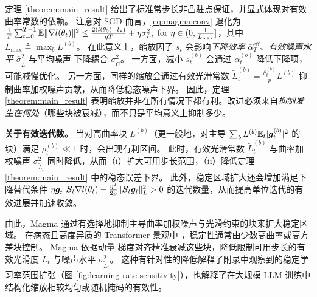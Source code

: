 \documentclass[11pt, a4paper, twocolumn, copyright, goog]{google}
\theoremstyle{plain}
\theoremstyle{definition}
\theoremstyle{remark}
\begin{document}
定理 \ref{theorem:main_result} 给出了标准常步长非凸驻点保证，并显式体现对有效曲率常数的依赖。
注意对 SGD 而言，\eqref{eq:magma:conv} 退化为 $\frac{1}{T} \sum_{t=0}^{T-1} \mathbb{E} \| \nabla l(\theta_t ) \|^2 \le \frac{2 (l(\theta_0) - l_*)}{\eta T} + \eta \sigma_L^2, \; \text{for } \eta \in (0, \frac{1}{L_{\max}}]$，其中 $L_{\max} \triangleq \max_b L^{(b)}$。
在此意义上，缩放因子 $s_t$ 会影响\emph{下降效率} $\bar{\alpha}_T^{\mathrm{eff}}$、\emph{有效噪声水平} $\bar{\sigma}^2_{\tilde{L}}$ 与平均噪声-下降耦合 $\sigma^2_{\bar{C}}$。
一方面，减小 $s_t^{(b)}$ 会通过 $\alpha_t^{(b)}$ 降低下降项，
可能减慢优化。
另一方面，同样的缩放会通过有效光滑常数 $\tilde{L}_t^{(b)} = \frac{\rho_t^{(b)}}{p} L^{(b)}$ 抑制曲率加权噪声贡献，从而降低稳态噪声下界。
因此，定理 \ref{theorem:main_result} 表明缩放并非在所有情况下都有利。改进必须来自\textit{抑制发生在何处}（哪些块被衰减），而不只是平均意义上抑制多少。


\textbf{关于有效迭代数。}
当对高曲率块 $L^{(b)}$（更一般地，对主导 $\sum_b L^{(b)} \mathbb{E}_t |{\bm{g}}_t^{(b)}|^2$ 的块）满足 $\rho_t^{(b)} \ll 1$ 时，会出现有利区间。
此时，有效光滑常数 $\tilde L_t^{(b)}$ 与曲率加权噪声 $\sigma^2_{\tilde L_t}$ 同时降低，从而（i）扩大可用步长范围，（ii）降低定理 \ref{theorem:main_result} 中的稳态误差下界。
此外，稳定区域扩大还会增加满足下降替代条件 $\eta {\bm{g}}_t^\top {\bm{S}}_t\nabla l(\theta_t) - \frac{\eta^2}{2p}\|{\bm{S}}_t {\bm{g}}_t\|_L^2 > 0$ 的迭代数量，从而提高单位迭代的有效进展并加速收敛。


由此，Magma 通过有选择地抑制主导曲率加权噪声与光滑约束的块来扩大稳定区域。 
在病态且高度异质的 Transformer 景观中 \citep{pan2023toward,ahn2023linear,orvieto2025search}，稳定性通常由少数高曲率或高方差块控制。 
Magma 依据动量-梯度对齐精准衰减这些块，降低限制可用步长的有效光滑度 $\tilde L_t$ 与噪声水平 $\sigma^2_{\tilde L_t}$。 
这种有针对性的降低解释了附录中观察到的稳定学习率范围扩张（图 \ref{fig:learning-rate-sensitivity}），也解释了在大规模 LLM 训练中结构化缩放相较均匀或随机掩码的有效性。






\end{document}
